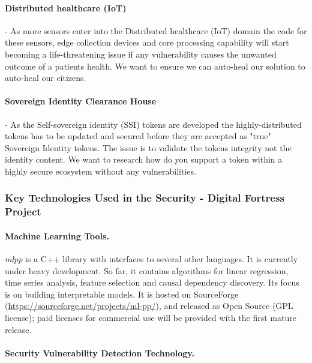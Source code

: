 \documentclass[a4paper,11pt]{article}
\newcommand{\project}[1]{\textbf{#1}\xspace}
\newcommand{\SECURITY}{\project{Security - Digital Fortress}}
\newcommand{\TheProject}{\SECURITY}
\begin{document}
\paragraph{Distributed healthcare (IoT)}
\label{sec:health:IoT}
- As more sensors enter into the Distributed healthcare (IoT) domain the code for these sensors, edge collection devices and core processing capability will start becoming a life-threatening issue if any vulnerability causes the unwanted outcome of a patients health. We want to ensure we can auto-heal our solution to auto-heal our citizens.

\paragraph{Sovereign Identity Clearance House}
\label{sec:ssi}
- As the Self-sovereign identity (SSI) tokens are developed the highly-distributed tokens has to be updated and secured before they are accepted as "true" Sovereign Identity tokens. The issue is to validate the tokens integrity not the identity content. We want to research how do you support a token within a highly secure ecosystem without any vulnerabilities.

\subsubsection{Key Technologies Used in the \TheProject{} Project}
\label{sect:key-technologies}

\paragraph{\SCCHshort{} Machine Learning Tools.}
\label{sec:mlpp}
\emph{mlpp} is a C++ library with interfaces to several other languages. It 
is currently under heavy development. So far, it contains algorithms for 
linear regression, time series analysis, feature selection and causal 
dependency discovery. Its focus is on building interpretable models. It is hosted 
on SourceForge (\url{https://sourceforge.net/projects/ml-pp/}), and released 
as Open Source (GPL license); paid licenses for commercial use will be provided
with the first mature release.

\paragraph{\IBM{} Security Vulnerability Detection Technology.}
\end{document}
